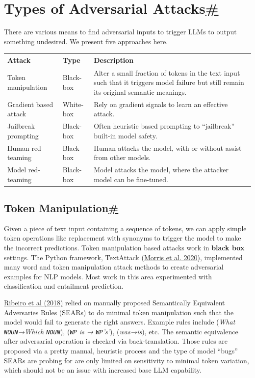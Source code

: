 \section{\texorpdfstring{Types of Adversarial Attacks\hyperref[types-of-adversarial-attacks]{\#}}{Types of Adversarial Attacks\#}}\label{types-of-adversarial-attacks}

There are various means to find adversarial inputs to trigger LLMs to output something undesired. We present five approaches here.

\begin{longtable}[]{@{}lll@{}}
\toprule\noalign{}
Attack & Type & Description \\
\midrule\noalign{}
\endhead
\bottomrule\noalign{}
\endlastfoot
Token manipulation & Black-box & Alter a small fraction of tokens in the text input such that it triggers model failure but still remain its original semantic meanings. \\
Gradient based attack & White-box & Rely on gradient signals to learn an effective attack. \\
Jailbreak prompting & Black-box & Often heuristic based prompting to ``jailbreak'' built-in model safety. \\
Human red-teaming & Black-box & Human attacks the model, with or without assist from other models. \\
Model red-teaming & Black-box & Model attacks the model, where the attacker model can be fine-tuned. \\
\end{longtable}

\subsection{\texorpdfstring{Token Manipulation\hyperref[token-manipulation]{\#}}{Token Manipulation\#}}\label{token-manipulation}

Given a piece of text input containing a sequence of tokens, we can apply simple token operations like replacement with synonyms to trigger the model to make the incorrect predictions. Token manipulation based attacks work in \textbf{black box} settings. The Python framework, TextAttack (\href{https://arxiv.org/abs/2005.05909}{Morris et al. 2020}), implemented many word and token manipulation attack methods to create adversarial examples for NLP models. Most work in this area experimented with classification and entailment prediction.

\href{https://www.aclweb.org/anthology/P18-1079/}{Ribeiro et al (2018)} relied on manually proposed Semantically Equivalent Adversaries Rules (SEARs) to do minimal token manipulation such that the model would fail to generate the right answers. Example rules include (\emph{What \texttt{NOUN}→Which \texttt{NOUN}}), (\emph{\texttt{WP} is → \texttt{WP}'s'}), (\emph{was→is}), etc. The semantic equivalence after adversarial operation is checked via back-translation. Those rules are proposed via a pretty manual, heuristic process and the type of model ``bugs'' SEARs are probing for are only limited on sensitivity to minimal token variation, which should not be an issue with increased base LLM capability.

